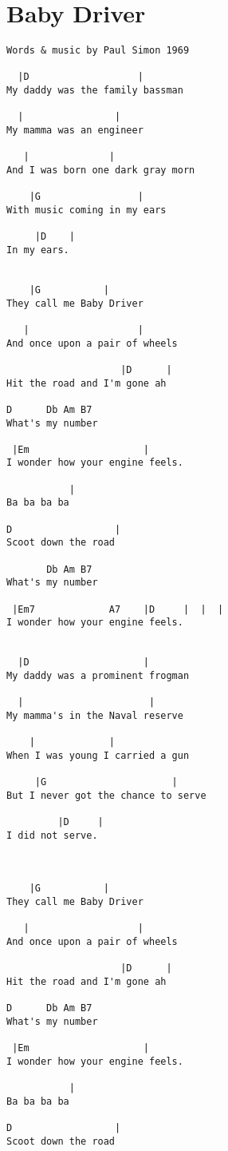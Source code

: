 \documentclass[leqno]{memoir}
\begin{document}
\chapter{Baby Driver}
\begin{verbatim}
Words & music by Paul Simon 1969

  |D                   |
My daddy was the family bassman

  |                |
My mamma was an engineer

   |              |
And I was born one dark gray morn

    |G                 |
With music coming in my ears

     |D    |
In my ears.


    |G           |
They call me Baby Driver

   |                   |
And once upon a pair of wheels

                    |D      |
Hit the road and I'm gone ah

D      Db Am B7
What's my number

 |Em                    |
I wonder how your engine feels.

           |
Ba ba ba ba

D                  |
Scoot down the road

       Db Am B7
What's my number

 |Em7             A7    |D     |  |  |
I wonder how your engine feels.


  |D                    |
My daddy was a prominent frogman

  |                      |
My mamma's in the Naval reserve

    |             |
When I was young I carried a gun

     |G                      |
But I never got the chance to serve

         |D     |
I did not serve.



    |G           |
They call me Baby Driver

   |                   |
And once upon a pair of wheels

                    |D      |
Hit the road and I'm gone ah

D      Db Am B7
What's my number

 |Em                    |
I wonder how your engine feels.

           |
Ba ba ba ba

D                  |
Scoot down the road


\end{verbatim}
\end{document}
